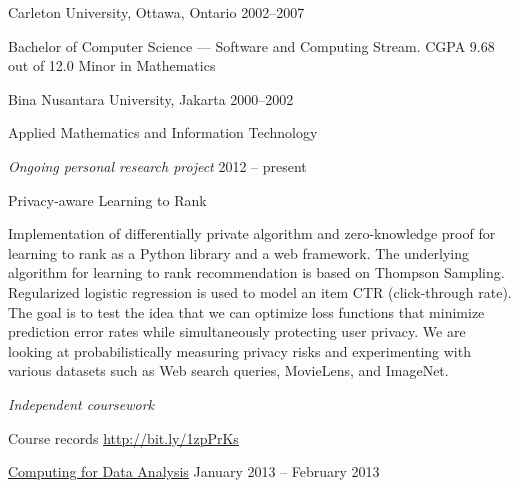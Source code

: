\documentclass[11pt,article,oneside]{memoir}
\begin{document}
\normalsize \vspace{0.11in}

\ind Carleton University, Ottawa, Ontario \hfill 2002--2007 

\ind \hspace{0.35in} \footnotesize Bachelor of Computer Science --- Software and Computing Stream. CGPA 9.68 out of 12.0
\newline
\ind \hspace{0.35in} \footnotesize Minor in Mathematics
\normalsize \vspace{0.11in}

\ind Bina Nusantara University, Jakarta \hfill 2000--2002

\ind \hspace{0.35in} \footnotesize Applied Mathematics and Information Technology

\bigskip

\medskip

\normalsize
\noindent\emph{Ongoing personal research project \vspace{0.05in}} \hfill 2012 -- present

\ind Privacy-aware Learning to Rank 

\ind \hspace{0.35in} Implementation of differentially private algorithm and zero-knowledge proof for learning to rank as a Python library and a web framework. The underlying algorithm for learning to rank recommendation is based on Thompson Sampling. Regularized logistic regression is used to model an item CTR (click-through rate). The goal is to test the idea that we can optimize loss functions that minimize prediction error rates while simultaneously protecting user privacy. We are looking at probabilistically measuring privacy risks and experimenting with various datasets such as Web search queries, MovieLens, and ImageNet.

\bigskip
\noindent\emph{Independent coursework \vspace{0.05in}}

\ind Course records \hfill \href{http://bit.ly/1zpPrKs}{http://bit.ly/1zpPrKs}

\medskip

\ind \href{https://www.coursera.org/course/compdata}{Computing for Data Analysis} \hfill January 2013 -- February 2013
\end{document}
